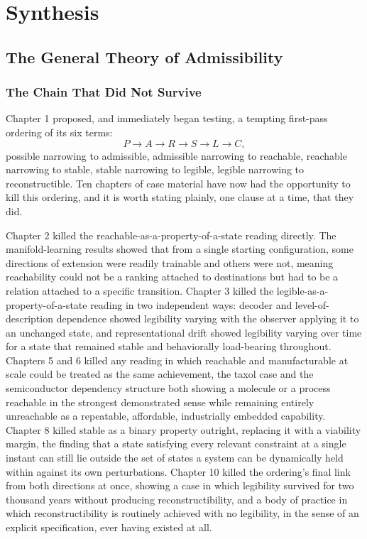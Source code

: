 \documentclass[11pt]{book}
\begin{document}
\part{Synthesis}


\chapter{The General Theory of Admissibility}

\section{The Chain That Did Not Survive}

Chapter 1 proposed, and immediately began testing, a tempting first-pass ordering of its six terms:
\[
P \rightarrow A \rightarrow R \rightarrow S \rightarrow L \rightarrow C,
\]
possible narrowing to admissible, admissible narrowing to reachable, reachable narrowing to stable, stable narrowing to legible, legible narrowing to reconstructible. Ten chapters of case material have now had the opportunity to kill this ordering, and it is worth stating plainly, one clause at a time, that they did.

Chapter 2 killed the reachable-as-a-property-of-a-state reading directly. The manifold-learning results showed that from a single starting configuration, some directions of extension were readily trainable and others were not, meaning reachability could not be a ranking attached to destinations but had to be a relation attached to a specific transition. Chapter 3 killed the legible-as-a-property-of-a-state reading in two independent ways: decoder and level-of-description dependence showed legibility varying with the observer applying it to an unchanged state, and representational drift showed legibility varying over time for a state that remained stable and behaviorally load-bearing throughout. Chapters 5 and 6 killed any reading in which reachable and manufacturable at scale could be treated as the same achievement, the taxol case and the semiconductor dependency structure both showing a molecule or a process reachable in the strongest demonstrated sense while remaining entirely unreachable as a repeatable, affordable, industrially embedded capability. Chapter 8 killed stable as a binary property outright, replacing it with a viability margin, the finding that a state satisfying every relevant constraint at a single instant can still lie outside the set of states a system can be dynamically held within against its own perturbations. Chapter 10 killed the ordering's final link from both directions at once, showing a case in which legibility survived for two thousand years without producing reconstructibility, and a body of practice in which reconstructibility is routinely achieved with no legibility, in the sense of an explicit specification, ever having existed at all.
\end{document}
